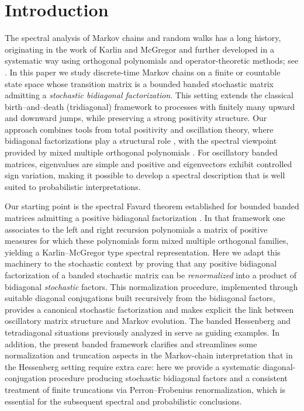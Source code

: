 \documentclass[11pt]{amsart}
\theoremstyle{plain}
\newcommand{\1}{\text{\fontseries{bx}\selectfont \textup 1}}
\begin{document}
 \maketitle
 
 


\thispagestyle{empty}
 \section{Introduction}
 
  The spectral analysis of Markov chains and random walks has a long history,
 originating in the work of Karlin and McGregor and further developed in a
 systematic way using orthogonal polynomials and operator-theoretic methods;
 see \cite{KarlinMcGregor,DominguezIglesia2022}. In this paper we study discrete-time Markov chains on a finite or countable state space whose transition matrix is a bounded banded stochastic matrix admitting a \emph{stochastic bidiagonal factorization}. This setting extends the classical birth--and--death (tridiagonal) framework to processes with finitely many upward and downward jumps, while preserving a strong positivity structure. Our approach combines tools from total positivity and oscillation theory, where bidiagonal factorizations play a structural role \cite{Gantmacher,Fallat,Pinkus}, with the spectral viewpoint provided by mixed multiple orthogonal polynomials \cite{nikishin_sorokin,Ismail,andrei_walter,afm}. For oscillatory banded matrices, eigenvalues are simple and positive and eigenvectors exhibit controlled sign variation, making it possible to develop a spectral description that is well suited to probabilistic interpretations.
 
 Our starting point is the spectral Favard theorem established for bounded banded matrices admitting a positive bidiagonal factorization \cite{BFM1,BFM4}. In that framework one associates to the left and right recursion polynomials a matrix of positive measures for which these polynomials form mixed multiple orthogonal families, yielding a Karlin--McGregor type spectral representation. Here we adapt this machinery to the stochastic context by proving that any positive bidiagonal factorization of a banded stochastic matrix can be \emph{renormalized} into a product of bidiagonal \emph{stochastic} factors. This normalization procedure, implemented through suitable diagonal conjugations built recursively from the bidiagonal factors, provides a canonical stochastic factorization and makes explicit the link between oscillatory matrix structure and Markov evolution. The banded Hessenberg and tetradiagonal situations previously analyzed in \cite{BFM2,BFM3} serve as guiding examples. In addition, the present banded framework clarifies and streamlines some normalization and truncation aspects in the Markov-chain interpretation that in the Hessenberg setting require extra care: here we provide a systematic diagonal-conjugation procedure producing stochastic bidiagonal factors and a consistent treatment of finite truncations via Perron--Frobenius renormalization, which is essential for the subsequent spectral and probabilistic conclusions.
 
\end{document}
